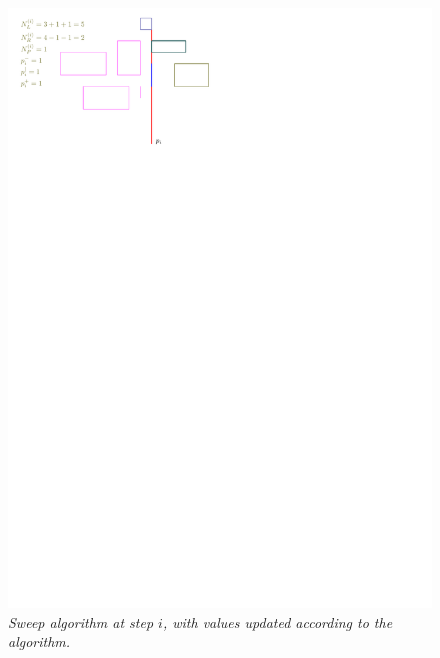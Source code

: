 \documentclass[12pt]{article}
\begin{document}
\begin{figure}
\centering
\includegraphics{figs/sweep2}
\caption{\textit{Sweep algorithm at step $i$, with values updated according to the algorithm.}}
\label{figure:sweep2}
\end{figure}
\end{document}
